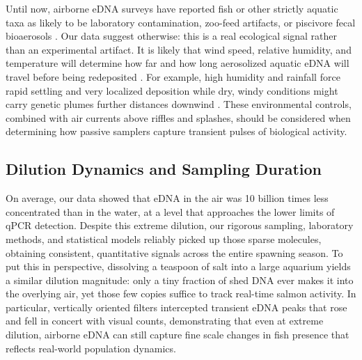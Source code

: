 \documentclass{article}
\begin{document}
Until now, airborne eDNA surveys have reported fish or other strictly aquatic taxa as likely to be laboratory contamination, zoo-feed artifacts, or piscivore fecal bioaerosols \cite{klepke2022,lynggaard2023, sullivan2023,lynggaard2022}. Our data suggest otherwise: this is a real ecological signal rather than an experimental artifact. It is likely that wind speed, relative humidity, and temperature will determine how far and how long aerosolized aquatic eDNA will travel before being redeposited \cite{abrego2024,giolai2024}. For example, high humidity and rainfall force rapid settling and very localized deposition while dry, windy conditions might carry genetic plumes further distances downwind \cite{galban2021,maki2023}. These environmental controls, combined with air currents above riffles and splashes, should be considered when determining how passive samplers capture transient pulses of biological activity.

\subsection{Dilution Dynamics and Sampling Duration}
On average, our data showed that eDNA in the air was 10 billion times less concentrated than in the water, at a level that approaches the lower limits of qPCR detection. Despite this extreme dilution, our rigorous sampling, laboratory methods, and statistical models reliably picked up those sparse molecules, obtaining consistent, quantitative signals across the entire spawning season. To put this in perspective, dissolving a teaspoon of salt into a large aquarium yields a similar dilution magnitude: only a tiny fraction of shed DNA ever makes it into the overlying air, yet those few copies suffice to track real-time salmon activity. In particular, vertically oriented filters intercepted transient eDNA peaks that rose and fell in concert with visual counts, demonstrating that even at extreme dilution, airborne eDNA can still capture fine scale changes in fish presence that reflects real-world population dynamics.
\end{document}
